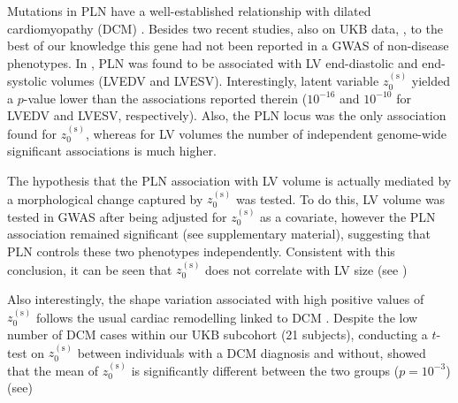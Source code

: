 Mutations in PLN have a well-established relationship with dilated cardiomyopathy (DCM) \cite{ref_Eijgenraam}. Besides two recent studies, also on UKB data, \cite{ref_pirruccello}, to the best of our knowledge this gene had not been reported in a GWAS of non-disease phenotypes. In \cite{ref_pirruccello}, PLN was found to be associated with LV end-diastolic and end-systolic volumes (LVEDV and LVESV). Interestingly, latent variable $z_0^{(\text{s})}$ yielded a $p$-value lower than the associations reported therein ($10^{-16}$ and $10^{-10}$ for LVEDV and LVESV, respectively). Also, the PLN locus was the only association found for $z_0^{(\text{s})}$, whereas for LV volumes the number of independent genome-wide significant associations is much higher. 

The hypothesis that the PLN association with LV volume is actually mediated by a morphological change captured by $z_0^{(\text{s})}$ was tested. To do this, LV volume was tested in GWAS after being adjusted for $z_0^{(\text{s})}$ as a covariate, however the PLN association remained significant (see supplementary material), suggesting that PLN controls these two phenotypes independently. Consistent with this conclusion, it can be seen that $z_0^{(\text{s})}$ does not correlate with LV size (see )

Also interestingly, the shape variation associated with high positive values of $z_0^{(\text{s})}$ follows the usual cardiac remodelling linked to DCM \cite{ref_dcm}. Despite the low number of DCM cases within our UKB subcohort (21 subjects), conducting a $t$-test on $z_0^{(\text{s})}$ between individuals with a DCM diagnosis and without, showed that the mean of $z_0^{(\text{s})}$ is significantly different between the two groups ($p=10^{-3}$) (see)


